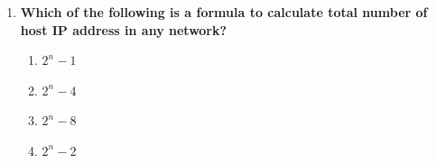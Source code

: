 \begin{flushleft}
\begin{enumerate}
		\item \textbf{Which of the following is a formula to calculate total number of host IP address in any network?}
		\begin{enumerate}[label=(\alph*)]
			\item $2^n-1$
			\item $2^n-4$
			\item $2^n-8$
			\item $2^n-2$   %
		\end{enumerate}
	\end{enumerate}
\end{flushleft}

\newpage

